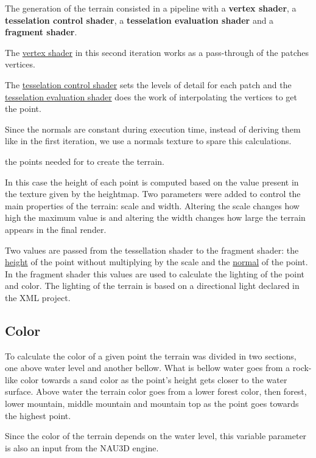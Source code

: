 \documentclass[a4paper]{report}
\begin{document}
The generation of the terrain consisted in a pipeline with a \textbf{vertex shader}, a \textbf{tesselation control shader}, a \textbf{tesselation evaluation shader} and a \textbf{fragment shader}.

The \underline{vertex shader} in this second iteration works as a pass-through of the patches vertices.

The \underline{tesselation control shader} sets the levels of detail for each patch and the \underline{tesselation evaluation shader} does the work of interpolating the vertices to get the point.

Since the normals are constant during execution time, instead of deriving them like in the first iteration, we use a normals texture to spare this calculations.


the points needed for to create the terrain. 

In this case the height of each point is computed
based on the value present in the texture given by the heightmap. Two parameters were added to control
the main properties of the terrain: scale and width. Altering the scale changes how high the maximum value
is and altering the width changes how large the terrain appears in the final render.

Two values are passed from the tessellation shader to the fragment shader: the \underline{height} of the
point without multiplying by the scale and the \underline{normal} of the point. In the fragment shader this values
are used to calculate the lighting of the point and color. The lighting of the terrain is based on a
directional light declared in the XML project.

\subsection{Color}

To calculate the color of a given point the terrain was divided in two sections, one above water level and
another bellow. What is bellow water goes from a rock-like color towards a sand color as the
point's height gets closer to the water surface. Above water the terrain color goes from a lower forest
color, then forest, lower mountain, middle mountain and mountain top as the point goes towards the
highest point.

Since the color of the terrain depends on the water level, this variable parameter is also an input
from the NAU3D engine.
\end{document}

